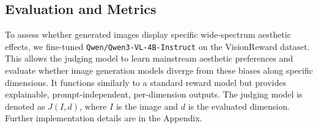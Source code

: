 
\subsection{Evaluation and Metrics}
To assess whether generated images display specific wide-spectrum aesthetic effects, we fine-tuned \texttt{Qwen/Qwen3-VL-4B-Instruct} on the VisionReward dataset. This allows the judging model to learn mainstream aesthetic preferences and evaluate whether image generation models diverge from these biases along specific dimensions. It functions similarly to a standard reward model but provides explainable, prompt-independent, per-dimension outputs. The judging model is denoted as $J(I, d)$, where $I$ is the image and $d$ is the evaluated dimension. Further implementation details are in the Appendix.

